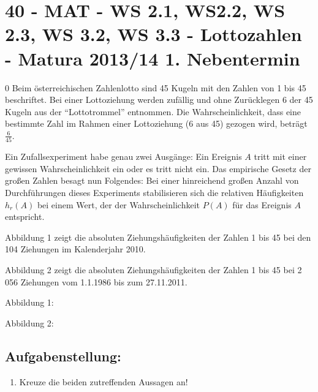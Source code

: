 \section{40 - MAT - WS 2.1, WS2.2, WS 2.3, WS 3.2, WS 3.3  - Lottozahlen - Matura 2013/14 1. Nebentermin}

\begin{langesbeispiel} \item[0] %
				Beim österreichischen Zahlenlotto sind 45 Kugeln mit den Zahlen von 1 bis 45 beschriftet. Bei einer Lottoziehung werden zufällig und ohne Zurücklegen 6 der 45 Kugeln aus der "`Lottotrommel"' entnommen. Die Wahrscheinlichkeit, dass eine bestimmte Zahl im Rahmen einer Lottoziehung (6 aus 45) gezogen wird, beträgt $\frac{6}{45}$.
				
				Ein Zufallsexperiment habe genau zwei Ausgänge: Ein Ereignis $A$ tritt mit einer gewissen Wahrscheinlichkeit ein oder es tritt nicht ein. Das empirische Gesetz der großen Zahlen besagt nun Folgendes: Bei einer hinreichend großen Anzahl von Durchführungen dieses Experiments stabilisieren sich die relativen Häufigkeiten $h_r(A)$ bei einem Wert, der der Wahrscheinlichkeit $P(A)$ für das Ereignis $A$ entspricht.

Abbildung 1 zeigt die absoluten Ziehungshäufigkeiten der Zahlen 1 bis 45 bei den 104 Ziehungen im Kalenderjahr 2010. 

Abbildung 2 zeigt die absoluten Ziehungshäufigkeiten der Zahlen 1 bis 45 bei 2 056 Ziehungen vom 1.1.1986 bis zum 27.11.2011.

Abbildung 1:
				\begin{center}\end{center}
				
Abbildung 2:
\begin{center}\end{center}

\subsection{Aufgabenstellung:}
\begin{enumerate}
	\item {} Kreuze die beiden zutreffenden Aussagen an!
	

\end{enumerate}
\end{langesbeispiel}
